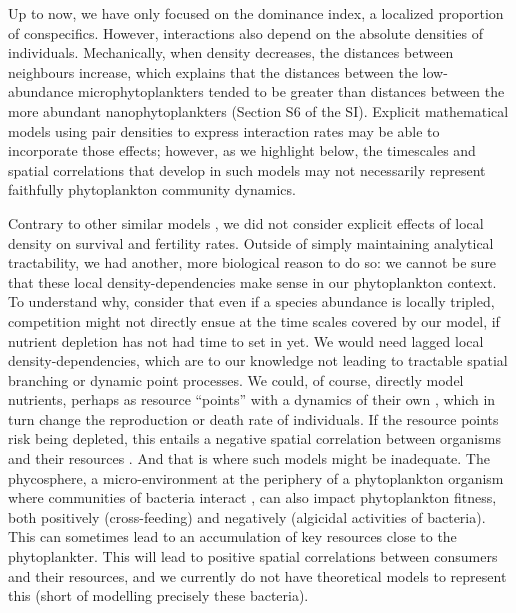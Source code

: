 \documentclass[english]{article}
\begin{document}
Up to now, we have only focused on the dominance index, a localized
proportion of conspecifics. However, interactions also depend on the
absolute densities of individuals. Mechanically, when density decreases,
the distances between neighbours increase, which explains that the
distances between the low-abundance microphytoplankters tended to
be greater than distances between the more abundant nanophytoplankters
(Section S6 of the SI). Explicit mathematical models using pair densities
to express interaction rates \citep[e.g.][]{law_population_2003,plank_spatial_2015}
may be able to incorporate those effects; however, as we highlight
below, the timescales and spatial correlations that develop in such
models may not necessarily represent faithfully phytoplankton community
dynamics. 

Contrary to other similar models \citep[e.g.,][]{birch_master_2006,bouderbala_3d_2018},
we did not consider explicit effects of local density on survival
and fertility rates. Outside of simply maintaining analytical tractability,
we had another, more biological reason to do so: we cannot be sure
that these local density-dependencies make sense in our phytoplankton
context. To understand why, consider that even if a species abundance
is locally tripled, competition might not directly ensue at the time
scales covered by our model, if nutrient depletion has not had time
to set in yet. We would need lagged local density-dependencies, which
are to our knowledge not leading to tractable spatial branching or
dynamic point processes. We could, of course, directly model nutrients,
perhaps as resource ``points'' with a dynamics of their own \citep{murrell_local_2005,north_interactions_2007},
which in turn change the reproduction or death rate of individuals.
If the resource points risk being depleted, this entails a negative
spatial correlation between organisms and their resources \citep{murrell_local_2005}.
And that is where such models might be inadequate. The phycosphere,
a micro-environment at the periphery of a phytoplankton organism where
communities of bacteria interact \citep{seymour_zooming_2017}, can
also impact phytoplankton fitness, both positively (cross-feeding)
and negatively (algicidal activities of bacteria). This can sometimes
lead to an accumulation of key resources close to the phytoplankter.
This will lead to positive spatial correlations between consumers
and their resources, and we currently do not have theoretical models
to represent this (short of modelling precisely these bacteria). 
\end{document}
